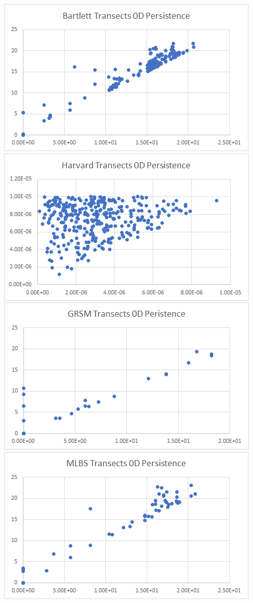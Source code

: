 \documentclass[10pt]{article}
\begin{document}
\noindent \includegraphics[scale = 0.5]{bartlett_transects_0d_persistence}
\includegraphics[scale = 0.5]{harvard_transects_0d_persistence}
\includegraphics[scale = 0.5]{grsm_transects_0d_persistence}
\includegraphics[scale = 0.5]{mlbs_transects_0d_persistence}\\
\end{document}
